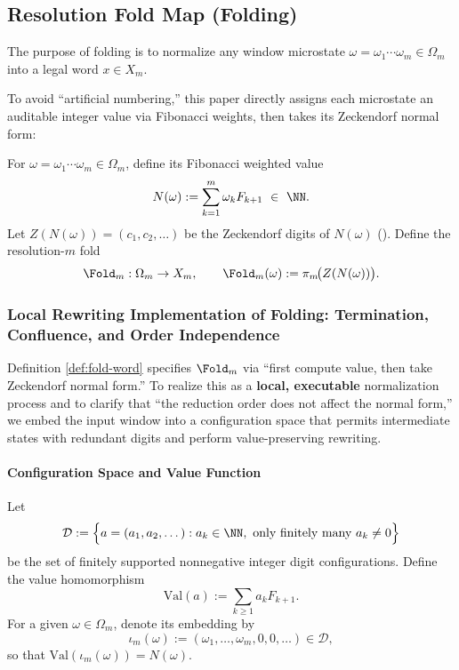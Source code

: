 \subsection{Resolution Fold Map (Folding)}\label{subsec:folding-map}

The purpose of folding is to normalize any window microstate $\omega=\omega_1\cdots \omega_m\in\Omega_m$ into a legal word $x\in X_m$.

To avoid ``artificial numbering,'' this paper directly assigns each microstate an auditable integer value via Fibonacci weights, then takes its Zeckendorf normal form:
\begin{definition}\label{def:fold-word}
For $\omega=\omega_1\cdots\omega_m\in\Omega_m$, define its Fibonacci weighted value
\[
N(\omega):=\sum_{k=1}^{m}\omega_k F_{k+1}\ \in\ \NN.
\]
Let $Z(N(\omega))=(c_1,c_2,\dots)$ be the Zeckendorf digits of $N(\omega)$ (\cite{Zeckendorf1972}). Define the resolution-$m$ fold
\[
\Fold_m:\Omega_m\to X_m,\qquad
\Fold_m(\omega):=\pi_m\!\bigl(Z(N(\omega))\bigr).
\]
\end{definition}

\subsubsection{Local Rewriting Implementation of Folding: Termination, Confluence, and Order Independence}\label{subsec:fold-local-rewrite}
Definition \ref{def:fold-word} specifies $\Fold_m$ via ``first compute value, then take Zeckendorf normal form.'' To realize this as a \textbf{local, executable} normalization process and to clarify that ``the reduction order does not affect the normal form,'' we embed the input window into a configuration space that permits intermediate states with redundant digits and perform value-preserving rewriting.

\paragraph{Configuration Space and Value Function}
Let
\[
\mathcal{D}:=\Bigl\{a=(a_1,a_2,\dots): a_k\in\NN,\ \text{only finitely many }a_k\neq 0\Bigr\}
\]
be the set of finitely supported nonnegative integer digit configurations. Define the value homomorphism
\[
\mathrm{Val}(a):=\sum_{k\ge 1} a_k F_{k+1}.
\]
For a given $\omega\in\Omega_m$, denote its embedding by
\[
\iota_m(\omega):=(\omega_1,\dots,\omega_m,0,0,\dots)\in\mathcal{D},
\]
so that $\mathrm{Val}(\iota_m(\omega))=N(\omega)$.

